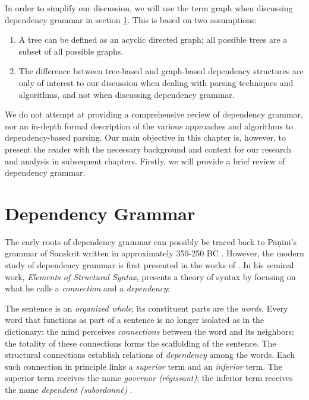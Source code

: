 In order to simplify our discussion, we will use the term graph when discussing dependency grammar in section \ref{grammar}. This is based on two assumptions:

\begin{enumerate}
\item A tree can be defined as an acyclic directed graph; all possible trees are a subset of all possible graphs.
\item The difference between tree-based and graph-based dependency structures are only of interest to our discussion when dealing with parsing techniques and algorithms, and not when discussing dependency grammar.
\end{enumerate}

We do not attempt at providing a comprehensive review of dependency grammar, nor an in-depth formal description of the various approaches and algorithms to dependency-based parsing. Our main objective in this chapter is, however, to present the reader with the necessary background and context for our research and analysis in subsequent chapters. Firstly, we will provide a brief review of dependency grammar.

\section{Dependency Grammar}
\label{grammar}

The early roots of dependency grammar can possibly be traced back to P\={a}\d{n}ini's grammar of Sanskrit written in approximately 350-250 BC \cite{Kruijff:02}. However, the modern study of  dependency grammar is first presented in the works of . In his seminal work, \textit{Elements of Structural Syntax}, \citeauthor{Tes:15} presents a theory of syntax by focusing on what he calls a \textit{connection} and a \textit{dependency}:

\begin{displayquote}
The sentence is an \textit{organized whole}; its constituent parts are the \textit{words}. Every word that functions as part of a sentence is no longer isolated as in the dictionary: the mind perceives \textit{connections} between the word and its neighbors; the totality of these connections forms the scaffolding of the sentence. The structural connections establish relations of \textit{dependency} among the words. Each such connection in principle links a \textit{superior} term and an \textit{inferior} term. The superior term receives the name \textit{governor (r\'{e}gissant)}; the inferior term receives the name \textit{dependent (subordonn\'{e})} \cite{Tes:15}.
\end{displayquote}

